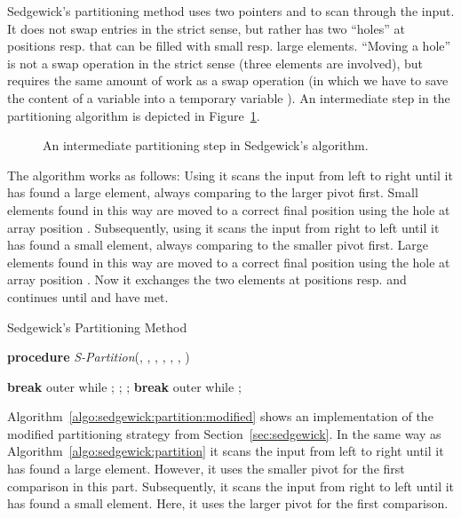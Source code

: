 \documentclass[prodmode,acmtalg]{acmsmall}
\begin{document}
Sedgewick's partitioning method uses two
pointers  and  to scan through the input. 
It does not swap
entries in the strict sense, but rather has two ``holes'' at positions
 resp.  that can be filled with small resp. large
elements. ``Moving a hole'' is not a swap operation in the strict sense (three elements are involved), but requires the
same amount of work as a swap operation (in which we have to save the content of a
variable into a temporary variable \cite{sedgewick}). An intermediate step in
the partitioning algorithm is depicted in Figure~\ref{fig:sedgewick:layout}.

\begin{figure}[tb]
    \centering
    \caption{An intermediate partitioning step in Sedgewick's algorithm.}
    \label{fig:sedgewick:layout}
\end{figure}

The algorithm works as follows: Using 
it scans the input
from left to right until it has found a large element, always
comparing to the larger pivot first. Small elements found in this way are moved
to a correct final position using the hole at array position . Subsequently, using  it scans
the input from right to left until it has found a small element, always
comparing to the smaller pivot first. Large elements found in this way are moved
to a correct final position using the hole at array position . Now it exchanges
the two elements at positions  resp.  and
continues until  and  have met.  


\begin{algorithm}
    \caption{Sedgewick's Partitioning Method}\samepage\label{algo:sedgewick:partition}
		\textbf{procedure} \textit{S-Partition}(,
		, , ,
		, , )
                \begin{algorithmic}[1]
		  \State 
                  \State 
                  \While{}
		  \If{} 
                  \State \textbf{break} outer while 
                  \EndIf
		  \If{} 
                  \State ;
                  \EndIf
		  \State ;
		 \EndWhile
		 \State 
                 \While{}
                 \If{} 
                 \State ; 
                 \EndIf
                 \If{} 
                 \State \textbf{break} outer while
                 \EndIf
		 \State ;
		 \EndWhile
		 \State 
		 \State 
		 \State 
		 \EndWhile
		 \State 
		 \State 
            \end{algorithmic}
        \end{algorithm}
Algorithm~\ref{algo:sedgewick:partition:modified} shows an implementation of the
modified partitioning strategy from Section~\ref{sec:sedgewick}. In the same way
as Algorithm~\ref{algo:sedgewick:partition} it scans the input from left to
right
until it has found a large element. However, it uses the smaller pivot for the
first comparison in this part. Subsequently, it scans the input from right
to left until it has found a small element. Here, it uses the larger pivot for
the first comparison. 
\end{document}
